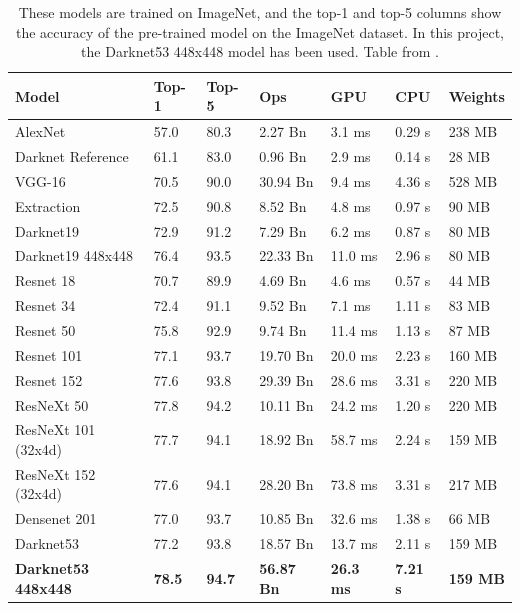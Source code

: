 \begin{table}[h!]
\begin{tabular}{lllllll}
Model               & Top-1 & Top-5 & Ops      & GPU     & CPU    & Weights \\ \hline
AlexNet             & 57.0  & 80.3  & 2.27 Bn  & 3.1 ms  & 0.29 s & 238 MB  \\
Darknet Reference   & 61.1  & 83.0  & 0.96 Bn  & 2.9 ms  & 0.14 s & 28 MB   \\
VGG-16              & 70.5  & 90.0  & 30.94 Bn & 9.4 ms  & 4.36 s & 528 MB  \\
Extraction          & 72.5  & 90.8  & 8.52 Bn  & 4.8 ms  & 0.97 s & 90 MB   \\
Darknet19           & 72.9  & 91.2  & 7.29 Bn  & 6.2 ms  & 0.87 s & 80 MB   \\
Darknet19 448x448   & 76.4  & 93.5  & 22.33 Bn & 11.0 ms & 2.96 s & 80 MB   \\
Resnet 18           & 70.7  & 89.9  & 4.69 Bn  & 4.6 ms  & 0.57 s & 44 MB   \\
Resnet 34           & 72.4  & 91.1  & 9.52 Bn  & 7.1 ms  & 1.11 s & 83 MB   \\
Resnet 50           & 75.8  & 92.9  & 9.74 Bn  & 11.4 ms & 1.13 s & 87 MB   \\
Resnet 101          & 77.1  & 93.7  & 19.70 Bn & 20.0 ms & 2.23 s & 160 MB  \\
Resnet 152          & 77.6  & 93.8  & 29.39 Bn & 28.6 ms & 3.31 s & 220 MB  \\
ResNeXt 50          & 77.8  & 94.2  & 10.11 Bn & 24.2 ms & 1.20 s & 220 MB  \\
ResNeXt 101 (32x4d) & 77.7  & 94.1  & 18.92 Bn & 58.7 ms & 2.24 s & 159 MB  \\
ResNeXt 152 (32x4d) & 77.6  & 94.1  & 28.20 Bn & 73.8 ms & 3.31 s & 217 MB  \\
Densenet 201        & 77.0  & 93.7  & 10.85 Bn & 32.6 ms & 1.38 s & 66 MB   \\
Darknet53           & 77.2  & 93.8  & 18.57 Bn & 13.7 ms & 2.11 s & 159 MB  \\
\textbf{Darknet53 448x448}   & \textbf{78.5}  & \textbf{94.7}  & \textbf{56.87 Bn} & \textbf{26.3 ms} & \textbf{7.21 s} & \textbf{159 MB} 
\end{tabular}
\caption{These models are trained on ImageNet, and the top-1 and top-5 columns show the accuracy of the pre-trained model on the ImageNet dataset. In this project, the Darknet53 448x448 model has been used. Table from \citep{YOLOv3}.}
\label{yolo_tab}
\end{table}





